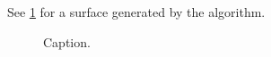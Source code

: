 \begin{enumerate}
    

%     
\end{enumerate}

See \cref{fig:diamond_square_surface} for a surface generated by the algorithm.

\begin{figure}
    \centering
    
    \caption{
        Caption.
        \label{fig:diamond_square_surface}
    }
\end{figure}

